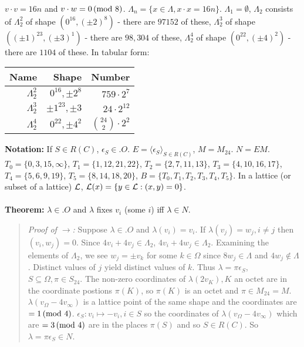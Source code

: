 $v \cdot v= 16n$ and $v \cdot w = 0 \thinspace \textnormal{(mod } 8 \textnormal{)}$.  
$\Lambda_n= \{ x  \in \Lambda, x \cdot x = 16n \}$.  $\Lambda_1 = \emptyset$,
$\Lambda_2$ consists of 
$\Lambda_2^2$ of shape $(0^{16}, (\pm 2)^8)$ - there are $97152$ of these,
$\Lambda_2^3$ of shape $((\pm 1)^{23}, (\pm 3)^1)$ - there are $98,304$ of these,
$\Lambda_2^4$ of shape $(0^{22}, (\pm 4)^2)$ - there are $1104$ of these.
In tabular form:
\begin{center}
\begin{tabular} {|r|r|r|}
\hline
{\bf Name} & {\bf Shape} & {\bf Number} \\
\hline
$\Lambda_2^2$ & $0^{16}, \pm 2^8$ & $759 \cdot 2^7$\\
\hline
$\Lambda_2^3$ & $\pm 1^{23}, \pm 3$ & $24 \cdot 2^{12}$\\
\hline
$\Lambda_2^4$ & $0^{22}, \pm 4^2$ & ${24 \choose 2} \cdot 2^2$\\
\hline
\end{tabular}
\end{center}
{\bf Notation:}
If $S \in R(C)$, $\epsilon_S \in .O$.
$E= \langle \epsilon_S \rangle_{S \in R(C)}$, $M= M_{24}$.  $N= EM$.
$T_0= \{0, 3, 15, \infty \}$,
$T_1= \{ 1,12,21,22 \}$,
$T_2= \{ 2,7,11,13 \}$,
$T_3= \{ 4,10,16,17 \}$,
$T_4= \{ 5,6,9,19 \}$,
$T_5= \{ 8, 14,18,20 \}$,
$B= \{ T_0, T_1, T_2, T_3, T_4, T_5 \}$.
In a lattice (or subset of a lattice) ${\cal L}$, ${\cal L}(x) = \{ y \in {\cal L}: (x,y) = 0 \}$.
\\
\\
{\bf Theorem:}
$\lambda \in .O$ and $\lambda$ fixes $v_i$ (some $i$) iff $\lambda \in N$.
\begin{quote}
\emph{Proof of $\rightarrow$:}
Suppose $\lambda \in .O$ and $\lambda(v_i)= v_i$.  If $\lambda(v_j)= w_j, i \ne j$ then
$(v_i, w_j)= 0$.  Since $4 v_i + 4 v_j \in \Lambda_2$,
$4 v_i + 4 w_j \in \Lambda_2$.  Examining the elements of $\Lambda_2$, we see
$w_j= \pm v_k$ for some $k \in \Omega$ since $8w_j \in \Lambda$ and $4w_j \notin \Lambda$.
Distinct values of $j$ yield distinct values of $k$.  Thus $\lambda= \pi \epsilon_S$,
$S \subseteq \Omega, \pi \in S_{24}$.  The non-zero coordinates of
$\lambda( 2 v_K ), K $ an octet are in the coordinate postions $\pi(K)$, so
$\pi(K)$ is an octet and  $\pi \in M_{24}=M$.  $\lambda( v_{\Omega} - 4 v_{\infty})$ is
a lattice point of the same shape and the coordinates are $=1 \thinspace \textnormal{(mod } 4 \textnormal{)}$.
$\epsilon_S: v_i \mapsto -v_i, i \in S$ so the coordinates of
$\lambda( v_{\Omega} - 4 v_{\infty})$ which are $= 3 \thinspace \textnormal{(mod } 4 \textnormal{)}$ are in the places
$\pi(S)$ and so $S \in R(C)$.  So $\lambda = \pi \epsilon_S \in N$.
\end{quote}
